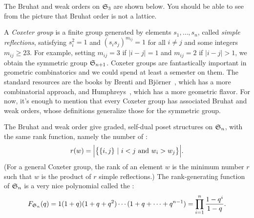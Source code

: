 \begin{example}
The Bruhat and weak orders on $\mathfrak{S}_3$ are shown below.  You should be able to see from the picture that Bruhat order is not a lattice.
\begin{center}
\end{center}

A \emph{Coxeter group} is a finite group generated by elements
$s_1,\dots,s_n$, called \emph{simple reflections}, satisfying
$s_i^2=1$ and $(s_is_j)^{m_{ij}}=1$ for all $i\neq j$ and some
integers $m_{ij}\geq23$.  For example, setting $m_{ij}=3$ if
$|i-j|=1$ and $m_{ij}=2$ if $|i-j|>1$, we obtain the symmetric group
$\mathfrak{S}_{n+1}$.  Coxeter groups are fantastically important in geometric
combinatorics and we could spend at least a semester on them.  The standard resources are the books by Brenti and Bj\"orner~\cite{BB}, which has a more combinatorial approach, and Humphreys~\cite{Humphreys}, which has a more geometric flavor.  For
now, it's enough to mention that every Coxeter group has associated
Bruhat and weak orders, whose definitions generalize those for the symmetric group.

The Bruhat and weak order give graded, self-dual poset structures on
$\mathfrak{S}_n$, with the same rank function, namely the number
of :
\[r(w) = \Big|\big\{\{i,j\} ~|~ i<j~\text{and}~w_i>w_j\big\}\Big|.\]
(For a general Coxeter group, the rank of an element $w$ is the minimum number $r$ such that $w$ is the product of $r$ simple reflections.)
The rank-generating function of $\mathfrak{S}_n$ is a very nice polynomial called the :
\[F_{\mathfrak{S}_n}(q) = 1(1+q)(1+q+q^2)\cdots(1+q+\cdots+q^{n-1}) = \prod_{i=1}^n \frac{1-q^i}{1-q}.\]
\end{example}

